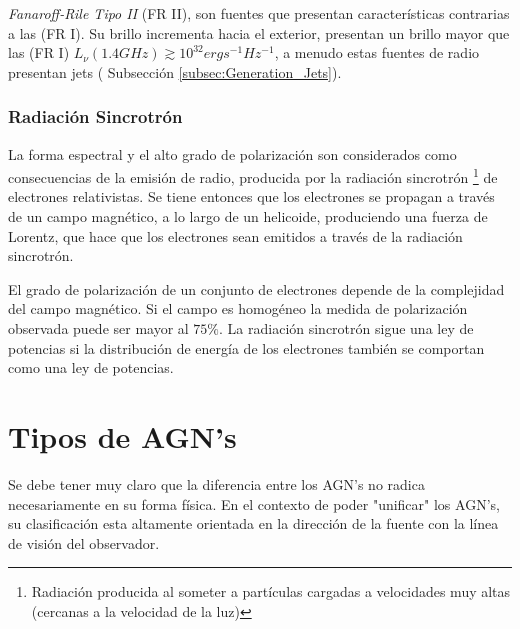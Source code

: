 {\it{Fanaroff-Rile Tipo II}} (FR II), son fuentes que presentan características contrarias a las (FR I). Su brillo incrementa hacia el exterior, presentan un brillo mayor que las (FR I) $L_{\nu}(1.4GHz)\gtrsim 10^{32} ergs^{-1}Hz^{-1}$, a menudo estas fuentes de radio presentan jets ( Subsección \ref{subsec:Generation_Jets}).



	\subsubsection{Radiación Sincrotrón}
	\label{subsubsec: Radiation_synchrotron}

La forma espectral y el alto grado de polarización son considerados como consecuencias de la emisión de radio, producida por la radiación sincrotrón \footnote{Radiación producida al someter a partículas cargadas a velocidades muy altas (cercanas a la velocidad de la luz) } de electrones relativistas. Se tiene entonces que los electrones se propagan a través de un campo magnético, a lo largo de un helicoide, produciendo una fuerza de Lorentz, que hace que los electrones sean emitidos a través de la radiación sincrotrón. 

El grado de polarización de un conjunto de electrones depende de la complejidad del campo magnético. Si el campo es homogéneo la medida de polarización observada puede ser mayor al $75\%$. La radiación sincrotrón sigue una ley de potencias si la distribución de energía de los electrones también se comportan como una ley de potencias. 


\section{Tipos de AGN's}
\label{sec:Zoo_AGN's}

Se debe tener muy claro que la diferencia entre los AGN's no radica necesariamente en su forma física. En el contexto de poder "unificar"  los AGN's, su clasificación esta altamente orientada en la dirección de la fuente con la línea de visión del observador. 


